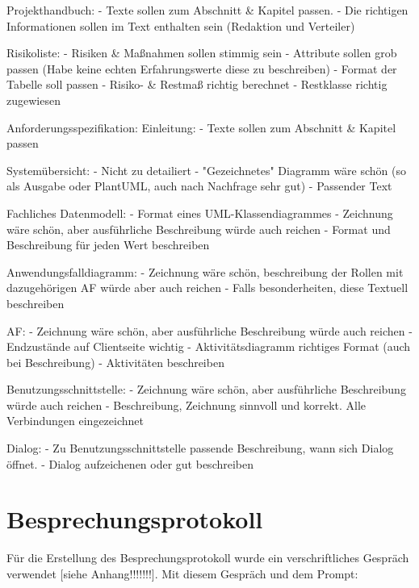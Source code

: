 Projekthandbuch:
- Texte sollen zum Abschnitt \& Kapitel passen.
- Die richtigen Informationen sollen im Text enthalten sein (Redaktion und Verteiler)

Risikoliste:
- Risiken \& Maßnahmen sollen stimmig sein
- Attribute sollen grob passen (Habe keine echten Erfahrungswerte diese zu beschreiben)
- Format der Tabelle soll passen
- Risiko- \& Restmaß richtig berechnet
- Restklasse richtig zugewiesen

Anforderungsspezifikation:
    Einleitung:
    - Texte sollen zum Abschnitt \&  Kapitel passen

    Systemübersicht:
    - Nicht zu detailiert
    - "Gezeichnetes" Diagramm wäre schön (so als Ausgabe oder PlantUML, auch nach Nachfrage sehr gut)
    - Passender Text

    Fachliches Datenmodell:
    - Format eines UML-Klassendiagrammes
    - Zeichnung wäre schön, aber ausführliche Beschreibung würde auch reichen
    - Format und Beschreibung für jeden Wert beschreiben

    Anwendungsfalldiagramm:
    - Zeichnung wäre schön, beschreibung der Rollen mit dazugehörigen AF würde aber auch reichen
    - Falls besonderheiten, diese Textuell beschreiben

    AF:
    - Zeichnung wäre schön, aber ausführliche Beschreibung würde auch reichen
    - Endzustände auf Clientseite wichtig
    - Aktivitätsdiagramm richtiges Format (auch bei Beschreibung)
    - Aktivitäten beschreiben

    Benutzungsschnittstelle:
    - Zeichnung wäre schön, aber ausführliche Beschreibung würde auch reichen
    - Beschreibung, Zeichnung sinnvoll und korrekt. Alle Verbindungen eingezeichnet

    Dialog:
    - Zu Benutzungsschnittstelle passende Beschreibung, wann sich Dialog öffnet.
    - Dialog aufzeichenen oder gut beschreiben

    




\section{Besprechungsprotokoll}  \label{CompBesprechungsprotokoll}

Für die Erstellung des Besprechungsprotokoll wurde ein verschriftliches Gespräch verwendet [siehe Anhang!!!!!!!]. Mit 
diesem Gespräch und dem Prompt:
    
